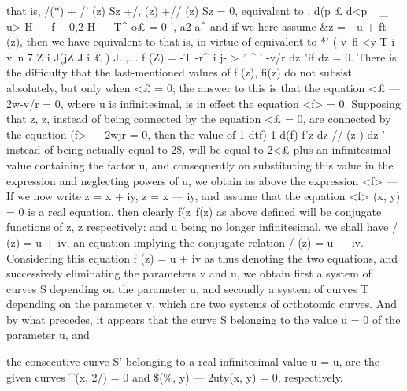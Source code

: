\documentclass[11pt,a4paper]{book}
\begin{document}
{{{{{{that  is,
/(*)  +  /'  (z)  Sz  +/,  (z)  +//  (z)  Sz  =  0,
equivalent  to
,      d(p  £       d<p  ~        \_
u>  H --- f---  0,2  H --- T^  o£  =  0  ',
a2  a^
and  if  we  here  assume
\&z  =  -  u  +  ft  (z),
then  we  have
equivalent  to
that  is,  in  virtue  of
equivalent  to
 *'  ( v\    fl <y         T     i  v\    n  7
Z  i    J(jZ        J  i    £ )    ^^
..,.  .
f  (Z)  =  -T  -r^  i  j-  >
'     ^  '       -v/r   dz  "if   dz
=  0.
There  is  the  difficulty  that  the  last-mentioned  values  of  f  (z),  fi(z)  do  not
subsist  absolutely,  but  only  when  <£  =  0;  the  answer  to  this  is  that  the  equation
<£  ---  2w-v/r  =  0,  where  u  is  infinitesimal,  is  in  effect  the  equation  <f>  =  0.  Supposing  that
z,  z,  instead  of  being  connected  by  the  equation  <£  =  0,  are  connected  by  the  equation
(f>  ---  2wjr  =  0,  then  the  value  of
1   dtf)         1      d(f)
f'z  dz     //  (z )  dz  '
instead  of  being  actually  equal  to  2\$,  will  be  equal  to  2<£  plus  an  infinitesimal
value  containing  the  factor  u,  and  consequently  on  substituting  this  value  in  the
expression
and  neglecting  powers  of  u,  we  obtain  as  above  the  expression  <f>  ---
If  we  now  write  z  =  x  +  iy,  z  =  x  ---  iy,  and  assume  that  the  equation  <f>  (x,  y)  =  0
is  a  real  equation,  then  clearly  f(z\  f(z)  as  above  defined  will  be  conjugate  functions
of  z,  z  respectively:  and  u  being  no  longer  infinitesimal,  we  shall  have
/  (z)  =  u  +  iv,
an  equation  implying  the  conjugate  relation
/  (z)  =  u  ---  iv.
Considering  this  equation  f  (z)  =  u  +  iv  as  thus  denoting  the  two  equations,  and
successively  eliminating  the  parameters  v  and  u,  we  obtain  first  a  system  of  curves
S  depending  on  the  parameter  u,  and  secondly  a  system  of  curves  T  depending  on
the  parameter  v,  which  are  two  systems  of  orthotomic  curves.  And  by  what  precedes,
it  appears  that  the  curve  S  belonging  to  the  value  u  =  0  of  the  parameter  u,  and


the   consecutive   curve    S'   belonging   to   a   real   infinitesimal   value   u  =  u,    are   the    given
curves
^(x,  2/)  =  0   and    \$(\%,  y)  ---  2uty(x,  y)  =  0,
respectively.
}}}}}}
\end{document}
